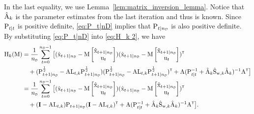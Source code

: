 In the last equality, we use Lemma~\ref{lem:matrix_inversion_lemma}. Notice that $\hat{{ \mathrm{A} }}_k$ is the parameter estimates from the last iteration and thus is known. Since ${ \mathrm{P} }_{t|t}$ is positive definite, \eqref{eq:P_t|nD} implies that $\mxP_{t|\nD}$ is also positive definite. By substituting \eqref{eq:P_t|nD} into \eqref{eq:H_k 2}, we have
\begin{align}
    \mxH_k(\mxM) &= 
    \frac{1}{\nD} \sum_{t=0}^{\nD-1} 
        \big[ (\hat{\vcx}_{t+1|\nD} - 
        {\mxM}
        \begin{bmatrix}
            \hat{\vcx}_{t+1|\nD} \\ \vcu_t
        \end{bmatrix}
        )
        (\hat{\vcx}_{t+1|\nD} - 
        {\mxM}
        \begin{bmatrix}
            \hat{\vcx}_{t+1|\nD} \\ \vcu_t
        \end{bmatrix}
        )^\tr \nonumber
        \\& \quad
        + (\mxP_{t+1|\nD}^{\frac{1}{2}} - {\mxA}\mxL_{t,k}\mxP_{t+1|\nD}^{\frac{1}{2}})(\mxP_{t+1|\nD}^{\frac{1}{2}} - {\mxA}\mxL_{t,k}\mxP_{t+1|\nD}^{\frac{1}{2}})^\tr 
        + \mxA(\mxP_{t|t}^{-1} + \hat{\mxA}_k \hat{\mxS}_{\vcw,k} \hat{\mxA}_k)^{-1}{\mxA}^\tr \big] \label{eq:H_theta|hat_theta PD1}\\
    &= 
    \frac{1}{\nD} \sum_{t=0}^{\nD-1} 
        \big[ (\hat{\vcx}_{t+1|\nD} - 
        {\mxM}
        \begin{bmatrix}
            \hat{\vcx}_{t+1|\nD} \\ \vcu_t
        \end{bmatrix}
        )
        (\hat{\vcx}_{t+1|\nD} - 
        {\mxM}
        \begin{bmatrix}
            \hat{\vcx}_{t+1|\nD} \\ \vcu_t
        \end{bmatrix}
        )^\tr \nonumber
        \\& \quad
        + (\mathbf{I} - {\mxA}\mxL_{t,k})\mxP_{t+1|\nD}(\mathbf{I} - {\mxA}\mxL_{t,k})^\tr 
        + \mxA(\mxP_{t|t}^{-1} + \hat{\mxA}_k \hat{\mxS}_{\vcw,k} \hat{\mxA}_k)^{-1}{\mxA}^\tr \big]. \label{eq:H_theta|hat_theta PD2}
\end{align}
